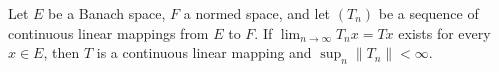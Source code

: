 Let $E$ be a Banach space, $F$ a normed space, and let $(T_n)$ be a sequence of continuous linear mappings from $E$ to $F$. If $\lim_{n \to \infty} T_n x = T x$ exists for every $x \in E$, then $T$ is a continuous linear mapping and $\sup_n \|T_n\| < \infty$.

